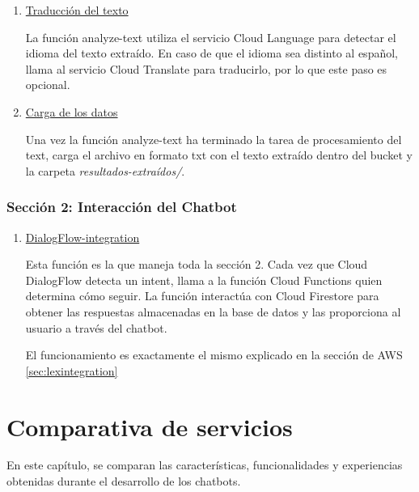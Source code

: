 \begin{enumerate}
    \item \underline{Traducción del texto}
    
    La función analyze-text utiliza el servicio Cloud Language para detectar el idioma del texto extraído. En caso de que el idioma sea distinto al español, llama al servicio Cloud Translate para traducirlo, por lo que este paso es opcional.

    \item \underline{Carga de los datos}
    
    Una vez la función analyze-text ha terminado la tarea de procesamiento del text, carga el archivo en formato txt con el texto extraído dentro del bucket y la carpeta \textit{resultados-extraídos/}.
    
\end{enumerate}

\subsubsection{Sección 2: Interacción del Chatbot}

\begin{enumerate}[7.]
    \item \underline{DialogFlow-integration}
    
    Esta función es la que maneja toda la sección 2. Cada vez que Cloud DialogFlow detecta un intent, llama a la función Cloud Functions quien determina cómo seguir. La función interactúa con Cloud Firestore para obtener las respuestas almacenadas en la base de datos y las proporciona al usuario a través del chatbot. 

    El funcionamiento es exactamente el mismo explicado en la sección de AWS \ref{sec:lexintegration} 

\end{enumerate}



\section{Comparativa de servicios}\label{comparativa}
En este capítulo, se comparan las características, funcionalidades y experiencias obtenidas durante el desarrollo de los chatbots.

